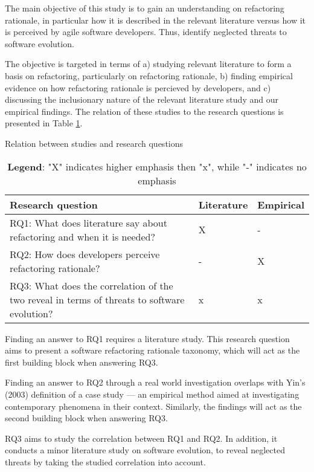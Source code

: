 The main objective of this study is to gain an understanding on refactoring rationale, in particular how it is described in the relevant literature versus how it is perceived by agile software developers. Thus, identify neglected threats to software evolution. 

The objective is targeted in terms of a) studying relevant literature to form a basis on refactoring, particularly on refactoring rationale, b) finding empirical evidence on how refactoring rationale is percieved by developers, and c) discussing the inclusionary nature of the relevant literature study and our empirical findings. The relation of these studies to the research questions is presented in Table \ref{table:researchQuestions}.

\begin{table}[ht!]
\centering
\caption{Relation between studies and research questions}
\label{table:researchQuestions}
    \begin{tabular}{ p{10cm} m{2cm} m{2cm}  }
     \hline
     \textbf{Research question}  &\textbf{Literature}  &\textbf{Empirical}  \\
     \hline
     RQ1: What does literature say about refactoring and when it is needed?                         &X      &-  \\
     \hline
     RQ2: How does developers perceive refactoring rationale?                                       &-      &X  \\
     \hline
     RQ3: What does the correlation of the two reveal in terms of threats to software evolution?    &x      &x  \\
     \hline
    \end{tabular}
\centering
\caption*{  \textbf{Legend}: "X" indicates higher emphasis then "x", while "-" indicates no emphasis}
\end{table}

Finding an answer to RQ1 requires a literature study. This research question aims to present a software refactoring rationale taxonomy, which will act as the first building block when answering RQ3.

Finding an answer to RQ2 through a real world investigation overlaps with Yin's (2003) definition of a case study --- an empirical method aimed at investigating contemporary phenomena in their context. Similarly, the findings will act as the second building block when answering RQ3.

RQ3 aims to study the correlation between RQ1 and RQ2. In addition, it conducts a minor literature study on software evolution, to reveal neglected threats by taking the studied correlation into account.

